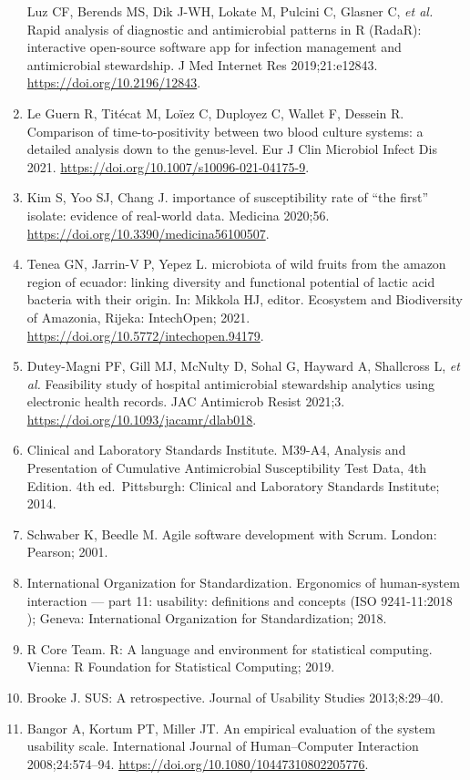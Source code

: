\documentclass[
]{book}
\begin{document}
\begin{enumerate}
  Luz CF, Berends MS, Dik J-WH, Lokate M, Pulcini C, Glasner C, \emph{et al.} Rapid analysis of diagnostic and antimicrobial patterns in R (RadaR): interactive open-source software app for infection management and antimicrobial stewardship. J Med Internet Res 2019;21:e12843. \url{https://doi.org/10.2196/12843}.
\item
  Le Guern R, Titécat M, Loïez C, Duployez C, Wallet F, Dessein R. Comparison of time-to-positivity between two blood culture systems: a detailed analysis down to the genus-level. Eur J Clin Microbiol Infect Dis 2021. \url{https://doi.org/10.1007/s10096-021-04175-9}.
\item
  Kim S, Yoo SJ, Chang J. importance of susceptibility rate of ``the first'' isolate: evidence of real-world data. Medicina 2020;56. \url{https://doi.org/10.3390/medicina56100507}.
\item
  Tenea GN, Jarrin-V P, Yepez L. microbiota of wild fruits from the amazon region of ecuador: linking diversity and functional potential of lactic acid bacteria with their origin. In: Mikkola HJ, editor. Ecosystem and Biodiversity of Amazonia, Rijeka: IntechOpen; 2021. \url{https://doi.org/10.5772/intechopen.94179}.
\item
  Dutey-Magni PF, Gill MJ, McNulty D, Sohal G, Hayward A, Shallcross L, \emph{et al.} Feasibility study of hospital antimicrobial stewardship analytics using electronic health records. JAC Antimicrob Resist 2021;3. \url{https://doi.org/10.1093/jacamr/dlab018}.
\item
  Clinical and Laboratory Standards Institute. M39-A4, Analysis and Presentation of Cumulative Antimicrobial Susceptibility Test Data, 4th Edition. 4th ed.~Pittsburgh: Clinical and Laboratory Standards Institute; 2014.
\item
  Schwaber K, Beedle M. Agile software development with Scrum. London: Pearson; 2001.
\item
  International Organization for Standardization. Ergonomics of human-system interaction --- part 11: usability: definitions and concepts (ISO 9241-11:2018 ); Geneva: International Organization for Standardization; 2018.
\item
  R Core Team. R: A language and environment for statistical computing. Vienna: R Foundation for Statistical Computing; 2019.
\item
  Brooke J. SUS: A retrospective. Journal of Usability Studies 2013;8:29--40.
\item
  Bangor A, Kortum PT, Miller JT. An empirical evaluation of the system usability scale. International Journal of Human--Computer Interaction 2008;24:574--94. \url{https://doi.org/10.1080/10447310802205776}.

\end{enumerate}
\end{document}
